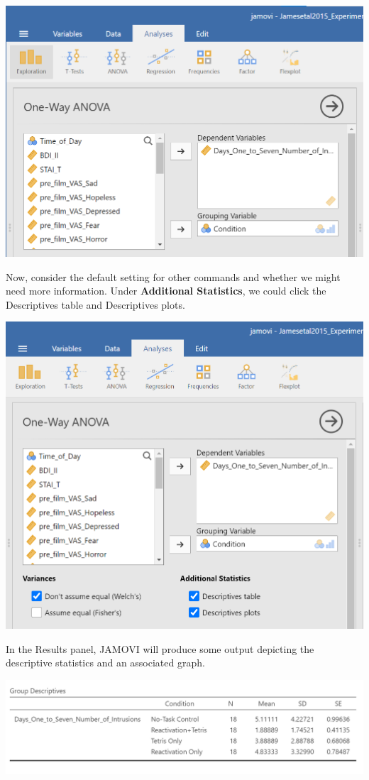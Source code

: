 \documentclass[
]{book}
\begin{document}
\includegraphics{img/OneWayANOVACommandsWithVariablesSelected.png}

Now, consider the default setting for other commands and whether we might need more information. Under \textbf{Additional Statistics}, we could click the {Descriptives table} and { Descriptives plots}.

\includegraphics{img/OneWayANOVACommandsWithDescriptiveStatsSelected.png}

In the Results panel, JAMOVI will produce some output depicting the descriptive statistics and an associated graph.

\includegraphics{img/OneWayANOVAResultsDescriptiveTable.png}
\end{document}
